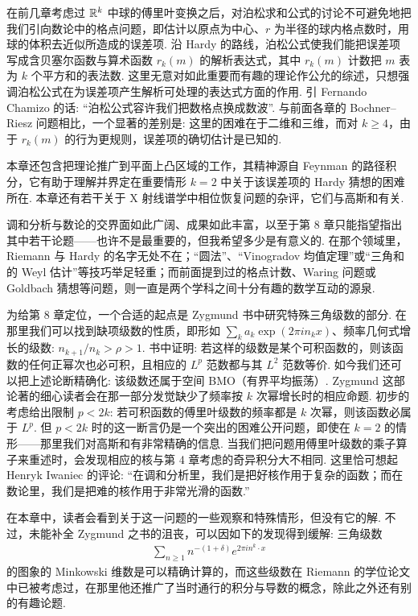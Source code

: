 在前几章考虑过 $\mathbb{R}^k$ 中球的傅里叶变换之后，对泊松求和公式的讨论不可避免地把我们引向数论中的格点问题，即估计以原点为中心、$r$ 为半径的球内格点数时，用球的体积去近似所造成的误差项. 沿 Hardy 的路线，泊松公式使我们能把误差项写成含贝塞尔函数与算术函数 $r_k(m)$ 的解析表达式，其中 $r_k(m)$ 计数把 $m$ 表为 $k$ 个平方和的表法数. 这里无意对如此重要而有趣的理论作公允的综述，只想强调泊松公式在为误差项产生解析可处理的表达式方面的作用. 引 Fernando Chamizo 的话: ``泊松公式容许我们把数格点换成数波''. 与前面各章的 Bochner--Riesz 问题相比，一个显著的差别是: 这里的困难在于二维和三维，而对 $k \ge 4$，由于 $r_k(m)$ 的行为更规则，误差项的确切估计是已知的.

本章还包含把理论推广到平面上凸区域的工作，其精神源自 Feynman 的路径积分，它有助于理解并界定在重要情形 $k=2$ 中关于该误差项的 Hardy 猜想的困难所在. 本章还有若干关于 X 射线谱学中相位恢复问题的杂评，它们与高斯和有关.

调和分析与数论的交界面如此广阔、成果如此丰富，以至于第 8 章只能指望指出其中若干论题——也许不是最重要的，但我希望多少是有意义的. 在那个领域里，Riemann 与 Hardy 的名字无处不在；``圆法''、``Vinogradov 均值定理''或``三角和的 Weyl 估计''等技巧举足轻重；而前面提到过的格点计数、Waring 问题或 Goldbach 猜想等问题，则一直是两个学科之间十分有趣的数学互动的源泉.

为给第 8 章定位，一个合适的起点是 Zygmund 书中研究特殊三角级数的部分. 在那里我们可以找到缺项级数的性质，即形如 $\sum_k a_k \exp(2\pi i n_k x)$、频率几何式增长的级数: $n_{k+1}/n_k > \rho > 1$. 书中证明: 若这样的级数是某个可积函数的，则该函数的任何正幂次也必可积，且相应的 $L^p$ 范数都与其 $L^2$ 范数等价. 如今我们还可以把上述论断精确化: 该级数还属于空间 BMO（有界平均振荡）. Zygmund 这部论著的细心读者会在那一部分发觉缺少了频率按 $k$ 次幂增长时的相应命题. 初步的考虑给出限制 $p < 2k$: 若可积函数的傅里叶级数的频率都是 $k$ 次幂，则该函数必属于 $L^p$. 但 $p < 2k$ 时的这一断言仍是一个突出的困难公开问题，即使在 $k = 2$ 的情形——那里我们对高斯和有非常精确的信息. 当我们把问题用傅里叶级数的乘子算子来重述时，会发现相应的核与第 4 章考虑的奇异积分大不相同. 这里恰可想起 Henryk Iwaniec 的评论: ``在调和分析里，我们是把好核作用于复杂的函数；而在数论里，我们是把难的核作用于非常光滑的函数.''

在本章中，读者会看到关于这一问题的一些观察和特殊情形，但没有它的解. 不过，未能补全 Zygmund 之书的沮丧，可以因如下的发现得到缓解: 三角级数
\begin{align*}
  \sum_{n \ge 1} n^{-(1+\delta)} e^{2\pi i n^k \cdot x}
\end{align*}
的图象的 Minkowski 维数是可以精确计算的，而这些级数在 Riemann 的学位论文 \cite{b194} 中已被考虑过，在那里他还推广了当时通行的积分与导数的概念，除此之外还有别的有趣论题.

